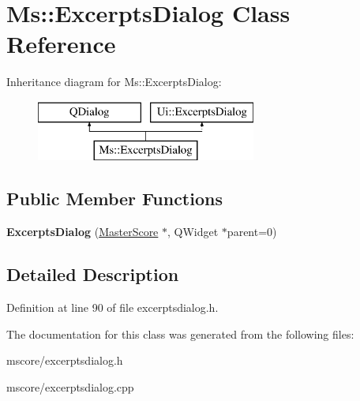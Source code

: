 \hypertarget{class_ms_1_1_excerpts_dialog}{}\section{Ms\+:\+:Excerpts\+Dialog Class Reference}
\label{class_ms_1_1_excerpts_dialog}
Inheritance diagram for Ms\+:\+:Excerpts\+Dialog\+:\begin{figure}[H]
\begin{center}
\leavevmode
\includegraphics[height=2.000000cm]{class_ms_1_1_excerpts_dialog}
\end{center}
\end{figure}
\subsection*{Public Member Functions}
\begin{DoxyCompactItemize}
\item 
\mbox{\label{class_ms_1_1_excerpts_dialog_a1f6a3da61e171d93bb5347481ca71436}} 
{\bfseries Excerpts\+Dialog} (\hyperlink{class_ms_1_1_master_score}{Master\+Score} $\ast$, Q\+Widget $\ast$parent=0)
\end{DoxyCompactItemize}


\subsection{Detailed Description}


Definition at line 90 of file excerptsdialog.\+h.



The documentation for this class was generated from the following files\+:\begin{DoxyCompactItemize}
\item 
mscore/excerptsdialog.\+h\item 
mscore/excerptsdialog.\+cpp\end{DoxyCompactItemize}
